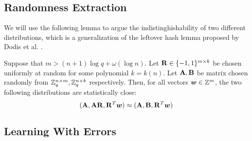 \subsection{Randomness Extraction}

We will use the following lemma to argue the indistinghishability of two different distributions, which is a generalization of the leftover hash lemma proposed by Dodis et al. \cite{EC:DodReySmi04}.

\begin{lemma} \label{lem:lhl}
Suppose that $m > (n + 1) \log q + \omega(\log n)$. Let $\mathbf{R} \in \{-1, 1\}^{m \times k}$ be chosen uniformly at random for some polynomial $k = k(n)$. Let $\mathbf{A}, \mathbf{B}$ be matrix chosen randomly from $\mathbb{Z}^{n \times m}_q, \mathbb{Z}^{n \times k}_q$ respectively. Then, for all vectors $\boldsymbol{w} \in \mathbb{Z}^m$, the two following distributions are statistically close:
$$(\mathbf{A}, \mathbf{A} \mathbf{R}, \mathbf{R}^T \boldsymbol{w}) \approx (\mathbf{A}, \mathbf{B}, \mathbf{R}^T \boldsymbol{w})$$
\end{lemma}

\subsection{Learning With Errors}

